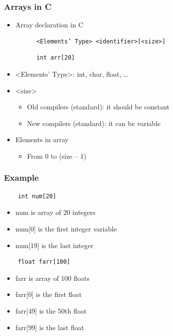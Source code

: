 \documentclass{../c-lecture}
\begin{document}
\begin{frame}[fragile]
  \frametitle{Arrays in C}
  \begin{itemize}
    \item Array declaration in C
    \begin{verbatim}
      <Elements’ Type> <identifier>[<size>]
    \end{verbatim}
    \begin{verbatim}
      int arr[20]
    \end{verbatim}
    \item
      <Elements’ Type>: int, char, float,
      \ldots
    \item <size>
    \begin{itemize}
      \item Old compilers (standard): it should be constant
      \item New compilers (standard): it can be variable
    \end{itemize}
    \item Elements in array
    \begin{itemize}
      \item From 0 to (size – 1)
    \end{itemize}
  \end{itemize}
\end{frame}

\begin{frame}[fragile]
  \frametitle{Example}
  \begin{verbatim}
    int num[20]
  \end{verbatim}
  \begin{itemize}
    \item num is array of 20 integers
    \item num[0] is the first integer variable
    \item num[19] is the last integer
  \end{itemize}
  \begin{verbatim}
    float farr[100]
  \end{verbatim}
  \begin{itemize}
    \item farr is array of 100 floats
    \item farr[0] is the first float
    \item farr[49] is the 50th float
    \item farr[99] is the last float
  \end{itemize}
\end{frame}
\end{document}
